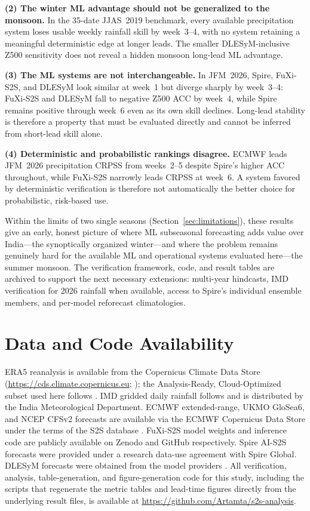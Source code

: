 \documentclass[11pt,a4paper]{article}
\begin{document}
\textbf{(2) The winter ML advantage should not be generalized to the monsoon.}
In the 35-date JJAS~2019 benchmark, every available precipitation system loses
usable weekly rainfall skill by week~3--4, with no system retaining a
meaningful deterministic edge at longer leads. The smaller DLESyM-inclusive
Z500 sensitivity does not reveal a hidden monsoon long-lead ML advantage.

\textbf{(3) The ML systems are not interchangeable.} In JFM~2026, Spire,
FuXi-S2S, and DLESyM look similar at week~1 but diverge sharply by
week~3--4: FuXi-S2S and DLESyM fall to negative Z500 ACC by week~4, while
Spire remains positive through week~6 even as its own skill declines.
Long-lead stability is therefore a property that must be evaluated directly
and cannot be inferred from short-lead skill alone.

\textbf{(4) Deterministic and probabilistic rankings disagree.} ECMWF leads
JFM~2026 precipitation CRPSS from weeks~2--5 despite Spire's higher ACC
throughout, while FuXi-S2S narrowly leads CRPSS at week~6. A system favored by
deterministic verification is therefore not automatically the better choice for
probabilistic, risk-based use.

Within the limits of two single seasons (Section~\ref{sec:limitations}), these
results give an early, honest picture of where ML subseasonal forecasting
adds value over India---the synoptically organized winter---and where the
problem remains genuinely hard for the available ML and operational systems
evaluated here---the summer monsoon. The verification framework, code, and result
tables are archived to support the next necessary extensions: multi-year
hindcasts, IMD verification for 2026 rainfall when available, access to Spire's
individual ensemble members, and per-model reforecast climatologies.

\section*{Data and Code Availability}

ERA5 reanalysis is available from the Copernicus Climate Data Store
(\url{https://cds.climate.copernicus.eu}; \citealt{hersbach2020}); the
Analysis-Ready, Cloud-Optimized subset used here follows \citet{carver2023}.
IMD gridded daily rainfall follows \citet{pai2014} and is distributed by the
India Meteorological Department. ECMWF extended-range, UKMO GloSea6, and NCEP
CFSv2 forecasts are available via the ECMWF Copernicus Data Store under the
terms of the S2S database \citep{vitart2017}. FuXi-S2S model weights and
inference code are publicly available on Zenodo and GitHub respectively. Spire
AI-S2S forecasts were provided under a research data-use agreement with Spire
Global. DLESyM forecasts were obtained from the model providers
\citep{cresswellclay2024}. All verification, analysis, table-generation, and
figure-generation code for this study, including the scripts that regenerate
the metric tables and lead-time figures directly from the underlying result
files, is available at \url{https://github.com/Artamta/s2s-analysis}.
\end{document}
